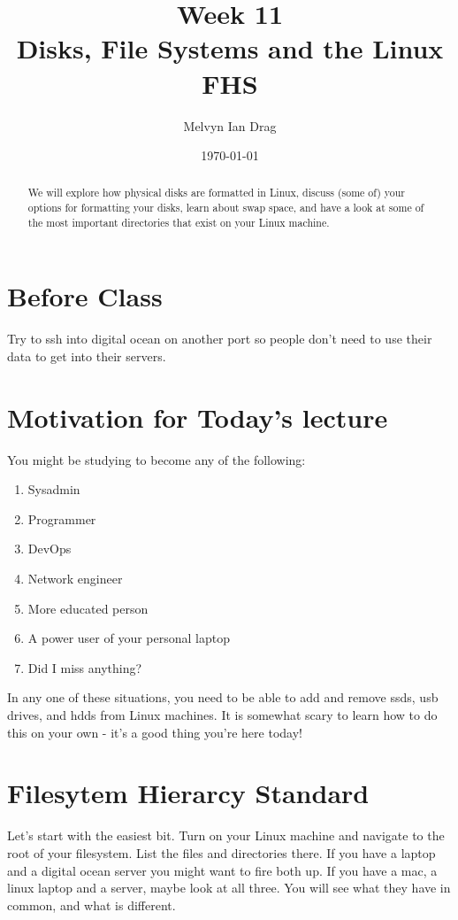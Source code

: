 \documentclass[10pt]{article}
\title{\textbf{Week 11} \\
\Large Disks, File Systems and the Linux FHS}
\author{ Melvyn Ian Drag }
\date{\today}
\begin{document}
\maketitle

\begin{abstract}
We will explore how physical disks are formatted in Linux,
discuss (some of) your options for formatting your disks, learn about swap
space, and have a look at some of the most important directories that exist on
your Linux machine.
\end{abstract}

\section{Before Class} 
Try to ssh into digital ocean on another port so people
don't need to use their data to get into their servers.


\section{Motivation for Today's lecture}

You might be studying to become any of the following:
\begin{enumerate}
\item Sysadmin
\item Programmer
\item DevOps
\item Network engineer
\item More educated person
\item A power user of your personal laptop
\item Did I miss anything?
\end{enumerate}

In  any one of these situations, you need to be able to add and remove ssds,
usb drives, and hdds from Linux machines. It is somewhat scary to learn how to
do this on your own - it's a good thing you're here today!

\section{Filesytem Hierarcy Standard}

Let's start with the easiest bit. Turn on
your Linux machine and navigate to the root of your filesystem. List the files
and directories there. If you have a laptop and a digital ocean server you might
want to fire both up. If you have a mac, a linux laptop and a server, maybe look
at all three. You will see what they have in common, and what is different.
\end{document}
